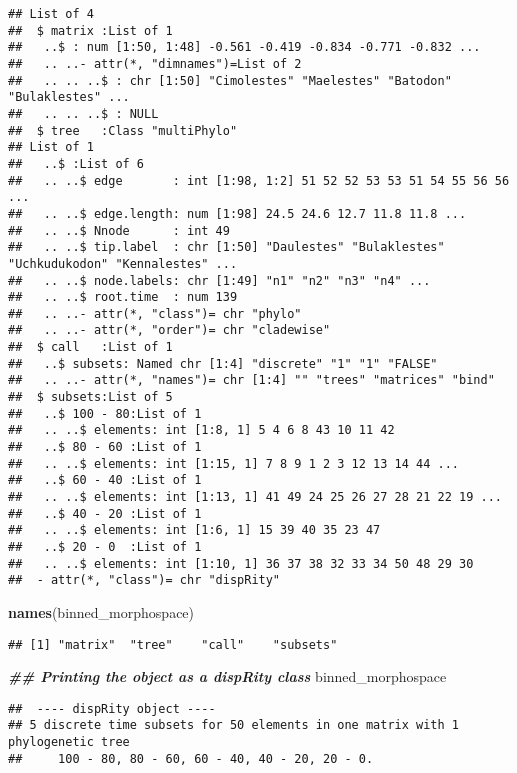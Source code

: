 \documentclass[
]{book}
\newenvironment{Shaded}{\begin{snugshade}}{\end{snugshade}}
\newcommand{\DocumentationTok}[1]{\textcolor[rgb]{0.56,0.35,0.01}{\textbf{\textit{#1}}}}
\newcommand{\FunctionTok}[1]{\textcolor[rgb]{0.13,0.29,0.53}{\textbf{#1}}}
\newcommand{\NormalTok}[1]{#1}
\begin{document}
\begin{verbatim}
## List of 4
##  $ matrix :List of 1
##   ..$ : num [1:50, 1:48] -0.561 -0.419 -0.834 -0.771 -0.832 ...
##   .. ..- attr(*, "dimnames")=List of 2
##   .. .. ..$ : chr [1:50] "Cimolestes" "Maelestes" "Batodon" "Bulaklestes" ...
##   .. .. ..$ : NULL
##  $ tree   :Class "multiPhylo"
## List of 1
##   ..$ :List of 6
##   .. ..$ edge       : int [1:98, 1:2] 51 52 52 53 53 51 54 55 56 56 ...
##   .. ..$ edge.length: num [1:98] 24.5 24.6 12.7 11.8 11.8 ...
##   .. ..$ Nnode      : int 49
##   .. ..$ tip.label  : chr [1:50] "Daulestes" "Bulaklestes" "Uchkudukodon" "Kennalestes" ...
##   .. ..$ node.labels: chr [1:49] "n1" "n2" "n3" "n4" ...
##   .. ..$ root.time  : num 139
##   .. ..- attr(*, "class")= chr "phylo"
##   .. ..- attr(*, "order")= chr "cladewise"
##  $ call   :List of 1
##   ..$ subsets: Named chr [1:4] "discrete" "1" "1" "FALSE"
##   .. ..- attr(*, "names")= chr [1:4] "" "trees" "matrices" "bind"
##  $ subsets:List of 5
##   ..$ 100 - 80:List of 1
##   .. ..$ elements: int [1:8, 1] 5 4 6 8 43 10 11 42
##   ..$ 80 - 60 :List of 1
##   .. ..$ elements: int [1:15, 1] 7 8 9 1 2 3 12 13 14 44 ...
##   ..$ 60 - 40 :List of 1
##   .. ..$ elements: int [1:13, 1] 41 49 24 25 26 27 28 21 22 19 ...
##   ..$ 40 - 20 :List of 1
##   .. ..$ elements: int [1:6, 1] 15 39 40 35 23 47
##   ..$ 20 - 0  :List of 1
##   .. ..$ elements: int [1:10, 1] 36 37 38 32 33 34 50 48 29 30
##  - attr(*, "class")= chr "dispRity"
\end{verbatim}

\begin{Shaded}
\begin{Highlighting}[]
\FunctionTok{names}\NormalTok{(binned\_morphospace)}
\end{Highlighting}
\end{Shaded}

\begin{verbatim}
## [1] "matrix"  "tree"    "call"    "subsets"
\end{verbatim}

\begin{Shaded}
\begin{Highlighting}[]
\DocumentationTok{\#\# Printing the object as a dispRity class}
\NormalTok{binned\_morphospace}
\end{Highlighting}
\end{Shaded}

\begin{verbatim}
##  ---- dispRity object ---- 
## 5 discrete time subsets for 50 elements in one matrix with 1 phylogenetic tree
##     100 - 80, 80 - 60, 60 - 40, 40 - 20, 20 - 0.
\end{verbatim}
\end{document}
